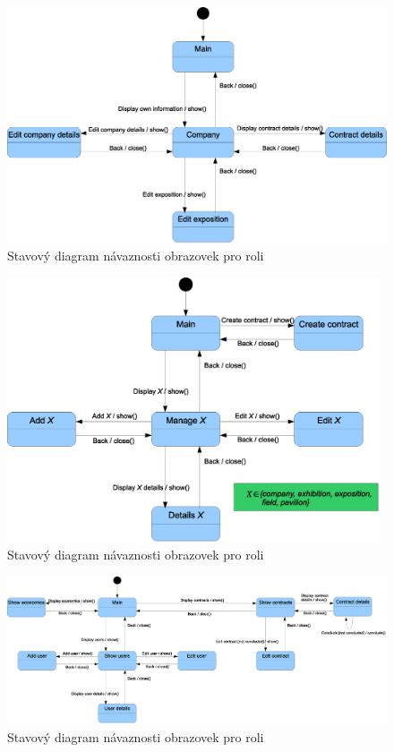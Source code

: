\begin{figure}[h]
	\includegraphics[width=11.8cm,keepaspectratio]{include/screens_role_firm}
	\caption{Stavový diagram návaznosti obrazovek pro roli }
	\label{fig:ScreensRoleFirm}
\end{figure}

\begin{figure}[h]
	\includegraphics[width=11cm,keepaspectratio]{include/screens_role_employee}
	\caption{Stavový diagram návaznosti obrazovek pro roli }
	\label{fig:ScreensRoleEmployee}
\end{figure}

\begin{landscape}
	\begin{figure}[h]
		\begin{center}
			\includegraphics[width=26cm,keepaspectratio]{include/screens_role_chief}
		\end{center}
		\caption{Stavový diagram návaznosti obrazovek pro roli }
		\label{fig:ScreensRoleChief}
	\end{figure}
\end{landscape}

